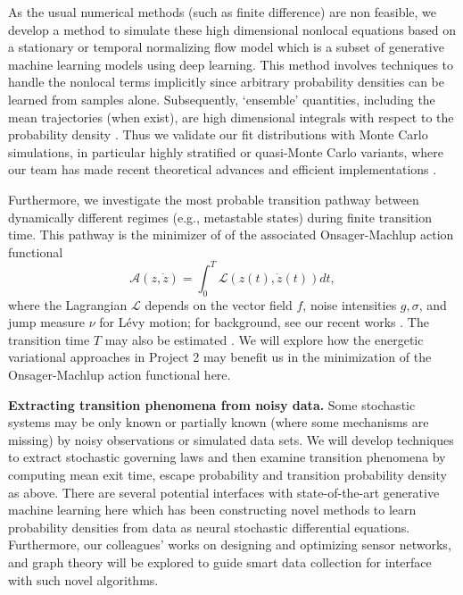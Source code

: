 \documentclass[11pt]{NSFamsart}
\begin{document}
  
As the usual numerical methods (such as finite difference) are non feasible, we develop a method to simulate these high dimensional nonlocal equations based on a stationary or temporal normalizing flow model which is a subset of generative machine learning models using deep learning. This method involves techniques to handle the nonlocal terms implicitly since arbitrary probability densities can be learned from samples alone. Subsequently, `ensemble' quantities, including the mean trajectories (when exist), are high dimensional integrals with respect to the probability density \cite{DuanBook2015}.  Thus we validate our fit distributions with Monte Carlo simulations, in particular highly stratified or quasi-Monte Carlo variants, where our team has made recent theoretical advances \cite{Hic17a, HicEtal17a} and efficient implementations \cite{QMCPy2020a}. 

Furthermore, we investigate the most probable transition pathway between dynamically different regimes (e.g., metastable states) during finite transition time. This pathway is the minimizer of  
of the associated Onsager-Machlup action functional 
$$
\mathcal{A}(z, \dot z) = \int_0^T \mathcal{L}(z(t), \dot z(t)) dt,
$$
where the Lagrangian  $\mathcal{L}$ depends on the vector field $f$, noise intensities $g, \sigma$, and  jump measure $\nu$ for L\'evy motion; for background, see   our recent works \cite{ChaoDuanOM,HuangYF}. The   transition time $T$ may also be estimated \cite{HuangYF2020}. We will explore how the energetic variational approaches in Project 2 may benefit us in the minimization of the Onsager-Machlup action functional here. 


 
\textbf{Extracting transition phenomena from noisy data.}
Some   stochastic systems may be only known or partially known (where some mechanisms are missing) by   noisy observations or simulated data sets. We will  develop techniques to extract stochastic governing laws \cite{YangLi2020a} and then examine transition phenomena by computing mean exit time, escape probability and transition probability density as above. 
There are several potential interfaces with state-of-the-art generative machine learning here which has been constructing novel methods to learn probability densities from data as neural stochastic differential equations. Furthermore, our colleagues'  works on 
designing and optimizing sensor networks, and graph theory \cite{karwa2016statistical,Calines2008MonitoringSF} will be explored to guide smart data collection for interface with such novel algorithms. 
\end{document}
